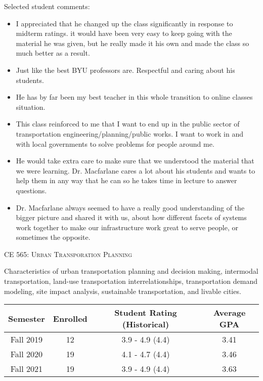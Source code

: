 \documentclass[margin,line]{res}
\newif\ifdetail
\newcommand{\acc}{\scshape }
\begin{document}
\begin{resume}
\begin{tabular}{cccc}
\end{tabular}

Selected student comments:
\begin{itemize}
  \item I appreciated that he changed up the class significantly in response to midterm
  ratings. it would have been very easy to keep going with the material he was
  given, but he really made it his own and made the class so much better as a
  result.
  \item Just like the best BYU professors are. Respectful and caring about his students.
  \item He has by far been my best teacher in this whole transition to online classes situation.
  \item This class reinforced to me that I want to end up in the public sector of
transportation engineering/planning/public works. I want to work in and with
local governments to solve problems for people around me.
  \item He would take extra care to make sure that we understood the material that we were learning. Dr. Macfarlane cares a lot about his students and wants to help them in any way that he can so he takes time in lecture to answer questions.
  \item Dr. Macfarlane always seemed to have a really good understanding of the bigger picture and shared it with us, about how different facets of systems work together to make our infrastructure work great to serve people, or sometimes the opposite.
\end{itemize}


\fi

\vspace{.4cm}
{\acc CE 565: Urban Transporation Planning}

\vspace{-.4cm}
Characteristics of urban transportation planning and decision making, intermodal
transportation, land-use transportation interrelationships, transportation
demand modeling, site impact analysis, sustainable transportation, and livable
cities.

\ifdetail
\begin{tabular}{cccc}
  \toprule
  Semester & Enrolled & Student Rating (Historical) & Average GPA\\
  \midrule
  Fall 2019 & 12 & 3.9 - 4.9 (4.4) & 3.41 \\
  Fall 2020 & 19 & 4.1 - 4.7 (4.4) & 3.46 \\
  Fall 2021 & 19 & 3.9 - 4.9 (4.4) & 3.63 \\
  \bottomrule


\end{tabular}
\end{resume}
\end{document}
